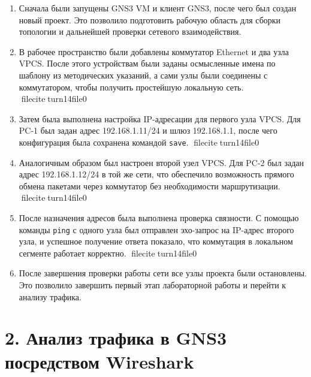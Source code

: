 \documentclass[
  english,
  russian,
  12pt,
  a4paper,
  DIV=11,
  numbers=noendperiod]{scrreprt}
\begin{document}
\begin{enumerate}
\def\labelenumi{\arabic{enumi}.}
\item
  Сначала были запущены GNS3 VM и клиент GNS3, после чего был создан
  новый проект. Это позволило подготовить рабочую область для сборки
  топологии и дальнейшей проверки сетевого взаимодействия.
\item
  В рабочее пространство были добавлены коммутатор Ethernet и два узла
  VPCS. После этого устройствам были заданы осмысленные имена по шаблону
  из методических указаний, а сами узлы были соединены с коммутатором,
  чтобы получить простейшую локальную сеть. fileciteturn14file0
\item
  Затем была выполнена настройка IP-адресации для первого узла VPCS. Для
  PC-1 был задан адрес 192.168.1.11/24 и шлюз 192.168.1.1, после чего
  конфигурация была сохранена командой \texttt{save}.
  fileciteturn14file0
\item
  Аналогичным образом был настроен второй узел VPCS. Для PC-2 был задан
  адрес 192.168.1.12/24 в той же сети, что обеспечило возможность
  прямого обмена пакетами через коммутатор без необходимости
  маршрутизации. fileciteturn14file0
\item
  После назначения адресов была выполнена проверка связности. С помощью
  команды \texttt{ping} с одного узла был отправлен эхо-запрос на
  IP-адрес второго узла, и успешное получение ответа показало, что
  коммутация в локальном сегменте работает корректно.
  fileciteturn14file0
\item
  После завершения проверки работы сети все узлы проекта были
  остановлены. Это позволило завершить первый этап лабораторной работы и
  перейти к анализу трафика.
\end{enumerate}

\section{2. Анализ трафика в GNS3 посредством
Wireshark}\label{ux430ux43dux430ux43bux438ux437-ux442ux440ux430ux444ux438ux43aux430-ux432-gns3-ux43fux43eux441ux440ux435ux434ux441ux442ux432ux43eux43c-wireshark}
\end{document}
